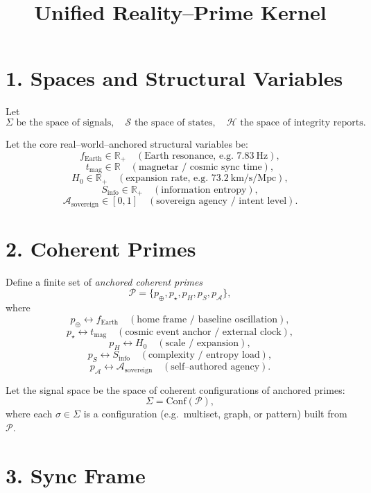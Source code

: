 \documentclass[12pt]{article}
\begin{document}
\title{Unified Reality--Prime Kernel}
\author{}
\date{}
\maketitle

\section*{1. Spaces and Structural Variables}

Let
\[
\Sigma \text{ be the space of signals}, \quad
\mathcal{S} \text{ the space of states}, \quad
\mathcal{H} \text{ the space of integrity reports}.
\]

Let the core real--world--anchored structural variables be:
\[
f_{\text{Earth}} \in \mathbb{R}_{+} \quad (\text{Earth resonance, e.g.\ } 7.83\ \text{Hz}),
\]
\[
t_{\text{mag}} \in \mathbb{R} \quad (\text{magnetar / cosmic sync time}),
\]
\[
H_0 \in \mathbb{R}_{+} \quad (\text{expansion rate, e.g.\ } 73.2\ \text{km/s/Mpc}),
\]
\[
S_{\text{info}} \in \mathbb{R}_{+} \quad (\text{information entropy}),
\]
\[
\mathcal{A}_{\text{sovereign}} \in [0,1] \quad (\text{sovereign agency / intent level}).
\]

\section*{2. Coherent Primes}

Define a finite set of \emph{anchored coherent primes}
\[
\mathcal{P} = \{p_{\oplus}, p_{\star}, p_{H}, p_{S}, p_{\mathcal{A}}\},
\]
where
\[
p_{\oplus} \leftrightarrow f_{\text{Earth}} \quad (\text{home frame / baseline oscillation}),
\]
\[
p_{\star} \leftrightarrow t_{\text{mag}} \quad (\text{cosmic event anchor / external clock}),
\]
\[
p_{H} \leftrightarrow H_0 \quad (\text{scale / expansion}),
\]
\[
p_{S} \leftrightarrow S_{\text{info}} \quad (\text{complexity / entropy load}),
\]
\[
p_{\mathcal{A}} \leftrightarrow \mathcal{A}_{\text{sovereign}} \quad (\text{self--authored agency}).
\]

Let the signal space be the space of coherent configurations of anchored primes:
\[
\Sigma = \mathrm{Conf}(\mathcal{P}),
\]
where each \(\sigma \in \Sigma\) is a configuration (e.g.\ multiset, graph, or pattern) built from \(\mathcal{P}\).

\section*{3. Sync Frame}
\end{document}
